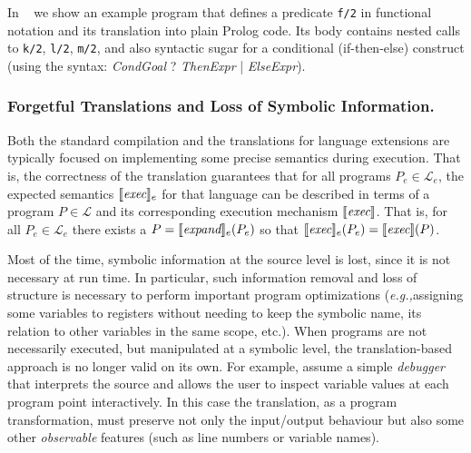 \documentclass[preprint]{llncs}
\renewcommand\cref[1]{\Cref{#1}}
\newcommand{\eg}{\emph{e.g.,\xspace}}
\newcommand{\pre}[1]{\texttt{#1}}
\begin{document}
\begin{example}
\label{ex:ex0}
  In ~\cref{fig:functional} we show an example program that defines a
  predicate \pre{f/2} in functional notation and its translation into
  plain Prolog code. Its body contains nested calls to \pre{k/2},
  \pre{l/2}, \pre{m/2}, and also syntactic sugar for a conditional
  (if-then-else) construct (using the syntax: \textit{CondGoal} \textrm{?}
    \textit{ThenExpr} \textrm{|} \emph{ElseExpr}). 
\end{example}

\subsubsection{Forgetful Translations and Loss of Symbolic Information.}
\label{sec:background:translation}

Both the standard compilation and the translations for language
extensions are 
typically focused on implementing some precise semantics during
execution. That is, the correctness of the translation guarantees
that for all programs $P_e \in \mathcal{L}_e$, the expected semantics
$\llbracket \textit{exec} \rrbracket _e$ for that language can be described in terms of a
program $P \in \mathcal{L}$ and its corresponding execution mechanism
$\llbracket \textit{exec} \rrbracket$. That is, for all $P_e \in \mathcal{L}_e$ there
exists a $P = \llbracket \textit{expand} \rrbracket _e(P_e)$ so that $\llbracket \textit{exec} \rrbracket _e(P_e) =
\llbracket \textit{exec} \rrbracket (P)$.

Most of the time, symbolic information at the source level is lost,
since it is not necessary at run time. In particular, such information
removal and loss of structure is necessary to perform
important program optimizations (\eg assigning some variables to
registers without needing to keep the symbolic name, its relation
to other variables in the same scope, etc.). When programs are not
necessarily executed, but manipulated at a symbolic level, the
translation-based approach is no longer valid on its own. For example,
assume a simple \emph{debugger} that interprets the source and allows
the user to inspect variable values at each program point
interactively. In this case the translation, as a program
transformation, must preserve not only the input/output
behaviour but also some other \emph{observable} features (such as line
numbers or variable names).
\end{document}

